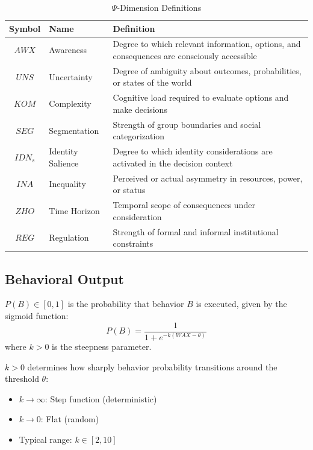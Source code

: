\begin{table}[htbp]
\centering
\caption{$\Psi$-Dimension Definitions}
\label{tab:psi-definitions}
\renewcommand{\arraystretch}{1.4}
\begin{tabular}{@{}clp{8cm}@{}}
\toprule
\textbf{Symbol} & \textbf{Name} & \textbf{Definition} \\
\midrule
$AWX$ & Awareness & Degree to which relevant information, options, and consequences are consciously accessible \\
$UNS$ & Uncertainty & Degree of ambiguity about outcomes, probabilities, or states of the world \\
$KOM$ & Complexity & Cognitive load required to evaluate options and make decisions \\
$SEG$ & Segmentation & Strength of group boundaries and social categorization \\
$IDN_s$ & Identity Salience & Degree to which identity considerations are activated in the decision context \\
$INA$ & Inequality & Perceived or actual asymmetry in resources, power, or status \\
$ZHO$ & Time Horizon & Temporal scope of consequences under consideration \\
$REG$ & Regulation & Strength of formal and informal institutional constraints \\
\bottomrule
\end{tabular}
\end{table}


\subsection{Behavioral Output}

\begin{definition}
\label{def:prob-behavior}
$P(B) \in [0,1]$ is the probability that behavior $B$ is executed, given by the sigmoid function:
\begin{equation}
P(B) = \frac{1}{1 + e^{-k(WAX - \theta)}}
\end{equation}
where $k > 0$ is the steepness parameter.
\end{definition}

\begin{definition}
\label{def:steepness}
$k > 0$ determines how sharply behavior probability transitions around the threshold $\theta$:
\begin{itemize}
\item $k \rightarrow \infty$: Step function (deterministic)
\item $k \rightarrow 0$: Flat (random)
\item Typical range: $k \in [2, 10]$
\end{itemize}
\end{definition}

